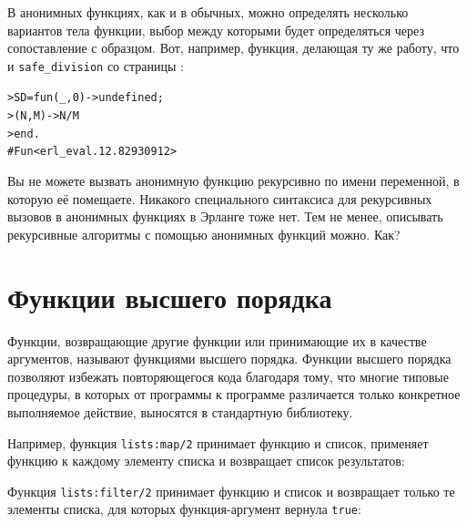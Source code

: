 \documentclass[
  paper=a4,
  fontsize=14pt,
  openany,
  appendixprefix=true
]{scrbook}
\begin{document}

В анонимных функциях, как и в обычных, можно определять несколько вариантов тела функции, выбор между которыми будет определяться через сопоставление с образцом. Вот, например, функция, делающая ту же работу, что и \lstinline{safe_division} со страницы \pageref{safe_division}:
\begin{alltt}
> SD = fun(_, 0) -> undefined;
>         (N, M) -> N / M
>      end.
#Fun<erl_eval.12.82930912>
\end{alltt}
\addtocounter{erlcommand}{1}
%

\begin{problem}\label{lambdarec}
\complicated Вы не можете вызвать анонимную функцию рекурсивно по имени переменной, в которую её помещаете. Никакого специального синтаксиса для рекурсивных вызовов в анонимных функциях в Эрланге тоже нет. Тем не менее, описывать рекурсивные алгоритмы с помощью анонимных функций можно. Как?
\end{problem}

\section{Функции высшего порядка}
\label{higher}

Функции, возвращающие другие функции или принимающие их в качестве аргументов, называют функциями высшего порядка. Функции высшего порядка позволяют избежать повторяющегося кода благодаря тому, что многие типовые процедуры, в которых от программы к программе различается только конкретное выполняемое действие, выносятся в стандартную библиотеку.

Например, функция \lstinline{lists:map/2} принимает функцию и список, применяет функцию к каждому элементу списка и возвращает список результатов:


Функция \lstinline{lists:filter/2} принимает функцию и список и возвращает только те элементы списка, для которых функция-аргумент вернула \lstinline{true}:

\end{document}
